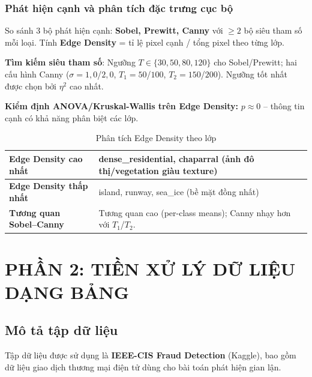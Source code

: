\documentclass[12pt,a4paper]{article}
\let\oldtextbf\textbf
\renewcommand{\textbf}[1]{\oldtextbf{\textcolor{hcmublue}{#1}}}
\begin{document}
\subsubsection{Phát hiện cạnh và phân tích đặc trưng cục bộ}

So sánh 3 bộ phát hiện cạnh: \textbf{Sobel, Prewitt, Canny} với $\geq 2$ bộ siêu tham số mỗi loại. Tính \textbf{Edge Density} = tỉ lệ pixel cạnh / tổng pixel theo từng lớp.

\textbf{Tìm kiếm siêu tham số}: Ngưỡng $T \in \{30, 50, 80, 120\}$ cho Sobel/Prewitt; hai cấu hình Canny ($\sigma = 1{,}0$/$2{,}0$, $T_1 = 50$/$100$, $T_2 = 150$/$200$). Ngưỡng tốt nhất được chọn bởi $\eta^2$ cao nhất.

\textbf{Kiểm định ANOVA/Kruskal-Wallis trên Edge Density:} $p \approx 0$ -- thông tin cạnh có khả năng phân biệt các lớp.

\begin{table}[H]
\centering
\begin{tabular}{|l|l|}
\hline
\textbf{Edge Density cao nhất}  & dense\_residential, chaparral (ảnh đô thị/vegetation giàu texture) \\ \hline
\textbf{Edge Density thấp nhất} & island, runway, sea\_ice (bề mặt đồng nhất) \\ \hline
\textbf{Tương quan Sobel--Canny} & Tương quan cao (per-class means); Canny nhạy hơn với $T_1$/$T_2$. \\ \hline
\end{tabular}
\caption{Phân tích Edge Density theo lớp}
\label{tab:edge_density}
\end{table}

\section{PHẦN 2: TIỀN XỬ LÝ DỮ LIỆU DẠNG BẢNG}

\subsection{Mô tả tập dữ liệu}

Tập dữ liệu được sử dụng là \textbf{IEEE-CIS Fraud Detection} (Kaggle), bao gồm dữ liệu giao dịch thương mại điện tử dùng cho bài toán phát hiện gian lận.
\end{document}
